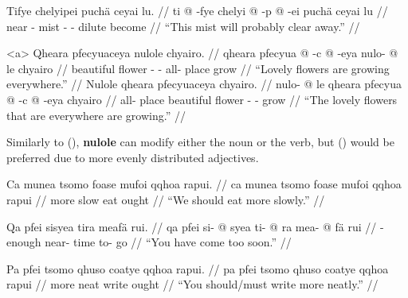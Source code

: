 \documentclass{article}
\begin{document}
\ex[lingstyle=QuCheanya] \begingl
\glpreamble Tifye chelyipei puch\"a ceyai lu. //
\gla ti @ -fye chelyi @ -p @ -ei puch\"a ceyai lu //
\glb near - mist - - dilute become  //
\glft ``This mist will probably clear away.'' //
\endgl \xe

\pex[lingstyle=QuCheanya,tag=flowers] 
\a<a> \begingl
\glpreamble Qheara pfecyuaceya nulole chyairo. //
\gla qheara pfecyua @ -c @ -eya nulo- @ le chyairo //
\glb beautiful flower - - all- place grow //
\glft ``Lovely flowers are growing everywhere.'' //
\endgl
\a \begingl
\glpreamble Nulole qheara pfecyuaceya chyairo. //
\gla nulo- @ le qheara pfecyua @ -c @ -eya chyairo //
\glb all- place beautiful flower - - grow //
\glft ``The lovely flowers that are everywhere are growing.'' //
\endgl
\xe

Similarly to (), \textbf{nulole} can modify either the noun or the verb, but () would be preferred due to more evenly distributed adjectives.

\ex[lingstyle=QuCheanya] \begingl
\glpreamble Ca munea tsomo foase mufoi qqhoa rapui. //
\gla ca munea tsomo foase mufoi qqhoa rapui //
\glb {}  more slow eat  ought //
\glft ``We should eat more slowly.'' //
\endgl \xe

\ex[lingstyle=QuCheanya] \begingl
\glpreamble Qa pfei sisyea tira meaf\"a rui. //
\gla qa pfei si- @ syea ti- @ ra mea- @ f\"a rui //
\glb {}  - enough near- time to- go  //
\glft ``You have come too soon.'' //
\endgl \xe

\ex[lingstyle=QuCheanya] \begingl
\glpreamble Pa pfei tsomo qhuso coatye qqhoa rapui. //
\gla pa pfei tsomo qhuso coatye qqhoa rapui //
\glb {}  more neat write  ought //
\glft ``You should/must write more neatly.'' //
\endgl \xe
\end{document}
